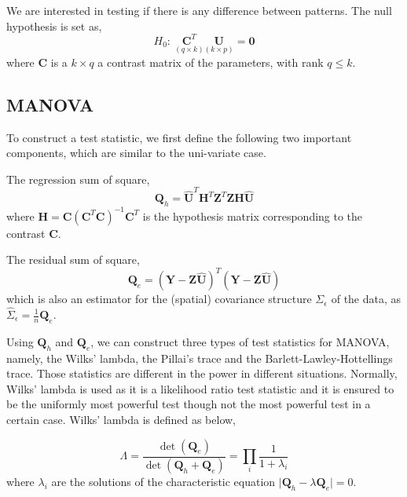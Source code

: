 \documentclass[english]{article}\usepackage[]{graphicx}\usepackage[]{color}
\begin{document}
We are interested in testing if there is any difference between patterns.
The null hypothesis is set as, 
\[
H_{0}:\ \underset{\left(q\times k\right)}{\boldsymbol{C}^{T}}\underset{\left(k\times p\right)}{\boldsymbol{U}}=\boldsymbol{0}
\]
where $\boldsymbol{C}$ is a $k\times q$ a contrast matrix of the
parameters, with rank $q\le k$.


\subsection{MANOVA\label{sub:MANOVA}}

To construct a test statistic, we first define the following two important
components, which are similar to the uni-variate case.

The regression sum of square, 
\begin{equation}
\boldsymbol{Q}_{h}=\hat{\boldsymbol{U}}^{T}\boldsymbol{H}^{T}\boldsymbol{Z}^{T}\boldsymbol{Z}\boldsymbol{H}\hat{\boldsymbol{U}}\label{eq:MANOVAQh}
\end{equation}
where $\boldsymbol{H}=\boldsymbol{C}\left(\boldsymbol{C}^{T}\boldsymbol{C}\right)^{-1}\boldsymbol{C}^{T}$
is the hypothesis matrix corresponding to the contrast $\boldsymbol{C}$.

The residual sum of square,
\begin{equation}
\boldsymbol{Q}_{e}=\left(\boldsymbol{Y}-\boldsymbol{Z}\hat{\boldsymbol{U}}\right)^{T}\left(\boldsymbol{Y}-\boldsymbol{Z}\hat{\boldsymbol{U}}\right)\label{eq:MANOVAQe}
\end{equation}
which is also an estimator for the (spatial) covariance structure
$\Sigma_{\epsilon}$ of the data, as $\hat{\Sigma}_{\epsilon}=\frac{1}{n}\boldsymbol{Q}_{e}$.

Using $\boldsymbol{Q}_{h}$ and $\boldsymbol{Q}_{e}$, we can construct
three types of test statistics for MANOVA, namely, the Wilks' lambda,
the Pillai's trace and the Barlett-Lawley-Hottellings trace. Those
statistics are different in the power in different situations. Normally,
Wilks' lambda is used as it is a likelihood ratio test statistic and
it is ensured to be the uniformly most powerful test though not the
most powerful test in a certain case. Wilks' lambda is defined as
below,

\begin{equation}
\Lambda=\frac{\det\left(\boldsymbol{Q}_{e}\right)}{\det\left(\boldsymbol{Q}_{h}+\boldsymbol{Q}_{e}\right)}=\prod_{i}\frac{1}{1+\lambda_{i}}
\end{equation}
where $\lambda_{i}$ are the solutions of the characteristic equation
$\mid\boldsymbol{Q}_{h}-\lambda\boldsymbol{Q}_{e}\mid=0$.
\end{document}
